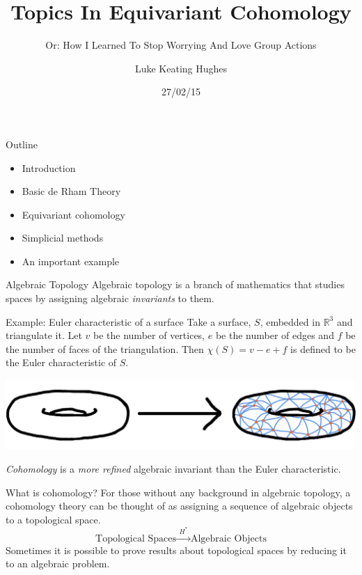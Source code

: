 \documentclass{beamer}
\title{Topics In Equivariant Cohomology}
\subtitle{Or: How I Learned To Stop Worrying And Love Group Actions}
\author[L. Keating Hughes]{Luke Keating Hughes}
\institute[UofA]{
Supervised by Prof. Michael Murray \& Dr. Danny Stevenson\\
University of Adelaide\\
Major Review\\}
\date{27/02/15}
\newcommand{\R}[1]{\mathbb{R}^{#1}}
\begin{document}
\begin{frame}[plain]
  \titlepage
\end{frame}






\begin{frame}{Outline}
\begin{itemize}
\item Introduction
\item Basic de Rham Theory
\item Equivariant cohomology
\item Simplicial methods
\item An important example


\end{itemize}
\end{frame}



\begin{frame}{Algebraic Topology}
Algebraic topology is a branch of mathematics that studies spaces by assigning algebraic \emph{invariants} to them.

\begin{exampleblock}{Example: Euler characteristic of a surface}
Take a surface, $S$, embedded in $\R{3}$ and triangulate it. Let $v$ be the number of vertices, $e$ be the number of edges and $f$ be the number of faces of the triangulation. Then $\chi(S)= v - e + f$ is defined to be the Euler characteristic of $S$.
\begin{center}
\includegraphics[scale=0.05]{triangulation2}
\end{center}
\end{exampleblock}
\emph{Cohomology} is a \emph{more refined} algebraic invariant than the Euler characteristic.
\end{frame}



\begin{frame}{What is cohomology?}
For those without any background in algebraic topology, a cohomology theory can be thought of as assigning a sequence of algebraic objects to a topological space.
\[
\mbox{Topological Spaces} \xrightarrow{~~H^{*}~~} \mbox{Algebraic Objects}
\]
Sometimes it is possible to prove results about topological spaces by reducing it to an algebraic problem.
\end{frame}
\end{document}
